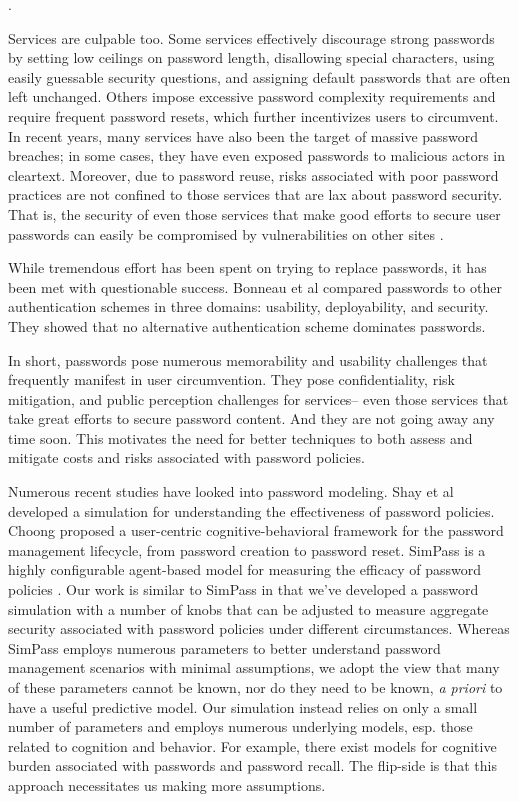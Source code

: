 \documentclass[conference]{IEEEtran}
\begin{document}
{\cite{blythe2013circumvention}.

Services are culpable too. Some services effectively discourage 
strong passwords by setting low ceilings on password length, 
disallowing special characters, using easily guessable security 
questions, and assigning default passwords that are often left 
unchanged. Others impose excessive 
password complexity requirements and require frequent 
password resets, which further incentivizes users to circumvent. 
In recent years, 
many services have also been the target of massive password 
breaches; in some cases, they have even exposed passwords to 
malicious actors in cleartext. Moreover, due to password reuse, 
risks associated with poor password practices are not confined 
to those services that are lax about password security. That is, 
the security of even those services that make good efforts to 
secure user passwords can easily be compromised by 
vulnerabilities on other sites \cite{ives2004domino}.

While tremendous effort has been spent on trying to replace 
passwords, it has been met with questionable success. Bonneau 
et al \cite{bonneau2012quest} compared passwords to other 
authentication schemes in three domains: usability, deployability, 
and security. They showed that no alternative authentication 
scheme dominates passwords.

In short, passwords pose numerous memorability and usability 
challenges that frequently manifest in user circumvention. They 
pose confidentiality, risk mitigation, and public perception 
challenges for services-- even those services that take great 
efforts to secure password content. And they are not going 
away any time soon. This motivates the need for better 
techniques to both assess and mitigate costs and risks 
associated with password policies.

Numerous recent studies have looked into password modeling.  Shay et
al \cite{shay2007password} developed a simulation for understanding
the effectiveness of password policies. Choong
\cite{choong2014cognitive} proposed a user-centric
cognitive-behavioral framework for the password management lifecycle,
from password creation to password reset. SimPass is a highly
configurable agent-based model for measuring the efficacy of password
policies \cite{renaud2013simpass}. Our work is similar to SimPass in
that we've developed a password simulation with a number of knobs
that can be adjusted to measure aggregate security associated with
password policies under different circumstances. Whereas SimPass 
employs numerous parameters to better understand password 
management scenarios with minimal assumptions, we adopt the view 
that many of these parameters cannot be known, nor do they need to be 
known, \textit{a priori} to have a useful predictive model. Our simulation 
instead relies on only a small number of parameters and employs 
numerous underlying models, esp. those related to cognition and behavior. 
For example, there exist models for cognitive burden associated with 
passwords and password recall. The flip-side is that this approach 
necessitates us making more assumptions.

}
\end{document}
